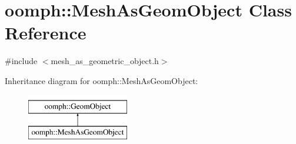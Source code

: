 \hypertarget{classoomph_1_1MeshAsGeomObject}{}\section{oomph\+:\+:Mesh\+As\+Geom\+Object Class Reference}
\label{classoomph_1_1MeshAsGeomObject}


{\ttfamily \#include $<$mesh\+\_\+as\+\_\+geometric\+\_\+object.\+h$>$}

Inheritance diagram for oomph\+:\+:Mesh\+As\+Geom\+Object\+:\begin{figure}[H]
\begin{center}
\leavevmode
\includegraphics[height=2.000000cm]{classoomph_1_1MeshAsGeomObject}
\end{center}
\end{figure}
